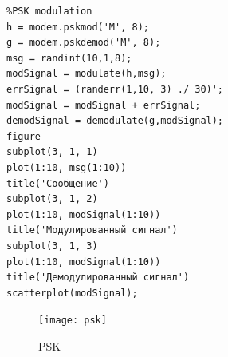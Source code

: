 \documentclass[10pt,a4paper]{article}
\begin{document}
\FloatBarrier
\begin{verbatim}
%PSK modulation
h = modem.pskmod('M', 8);
g = modem.pskdemod('M', 8);
msg = randint(10,1,8);
modSignal = modulate(h,msg);
errSignal = (randerr(1,10, 3) ./ 30)';
modSignal = modSignal + errSignal;
demodSignal = demodulate(g,modSignal);
figure
subplot(3, 1, 1)
plot(1:10, msg(1:10))
title('Сообщение')
subplot(3, 1, 2)
plot(1:10, modSignal(1:10))
title('Модулированный сигнал')
subplot(3, 1, 3)
plot(1:10, modSignal(1:10))
title('Демодулированный сигнал')
scatterplot(modSignal);
\end{verbatim}
\begin{figure}[h]\centering
	\texttt{[image: psk]}
	\caption{PSK}\label{fig.psk}
\end{figure}                                                                                                                                                                                                                                                                                                                                                                                                                                                                                                                                                                                                                                                                                                                                                                                                                                                                                                                                                                                                                                                                                                                                                                                                                                                                                                                                                                                                                                                                        
\end{document}
